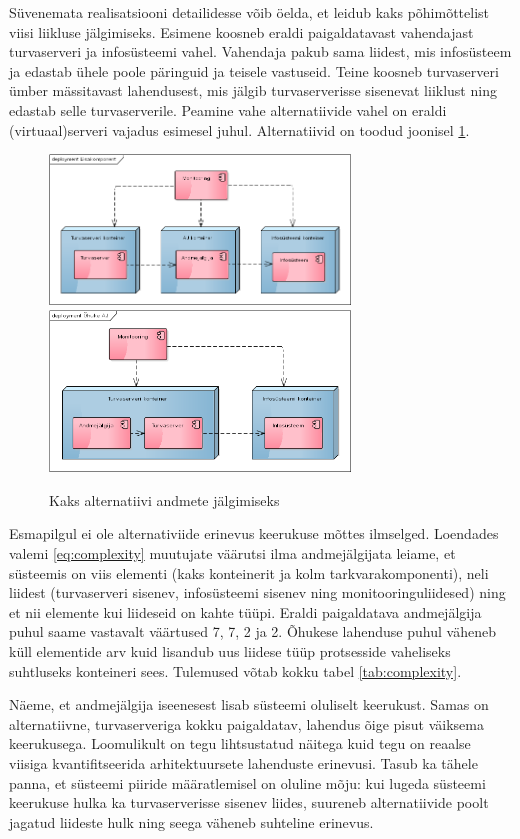 Süvenemata realisatsiooni detailidesse võib öelda, et leidub kaks põhimõttelist viisi liikluse jälgimiseks. Esimene koosneb eraldi paigaldatavast vahendajast turvaserveri ja infosüsteemi vahel. Vahendaja pakub sama liidest, mis infosüsteem ja edastab ühele poole päringuid ja teisele vastuseid. Teine koosneb turvaserveri ümber mässitavast lahendusest, mis jälgib turvaserverisse sisenevat liiklust ning edastab selle turvaserverile. Peamine vahe alternatiivide vahel on eraldi (virtuaal)serveri vajadus esimesel juhul. Alternatiivid on toodud joonisel \ref{fig:complexity:added}.


\begin{figure}[ht]
		\includegraphics[width=8cm]{lisakomponent.png}
		\includegraphics[width=8cm]{ohuke.png}
		\caption{Kaks alternatiivi andmete jälgimiseks}
		\label{fig:complexity:added}
\end{figure}

Esmapilgul ei ole alternativiide erinevus keerukuse mõttes ilmselged. Loendades valemi \ref{eq:complexity} muutujate väärutsi ilma andmejälgijata leiame, et süsteemis on viis elementi (kaks konteinerit ja kolm tarkvarakomponenti), neli liidest (turvaserveri sisenev, infosüsteemi sisenev ning monitooringuliidesed) ning et nii elemente kui liideseid on kahte tüüpi. Eraldi paigaldatava andmejälgija puhul saame vastavalt väärtused 7, 7, 2 ja 2. Õhukese lahenduse puhul väheneb küll elementide arv kuid lisandub uus liidese tüüp protsesside vaheliseks suhtluseks konteineri sees. Tulemused võtab kokku tabel \ref{tab:complexity}. 

Näeme, et andmejälgija iseenesest lisab süsteemi oluliselt keerukust. Samas on alternatiivne, turvaserveriga kokku paigaldatav, lahendus õige pisut väiksema keerukusega. Loomulikult on tegu lihtsustatud näitega kuid tegu on reaalse viisiga kvantifitseerida arhitektuursete lahenduste erinevusi. Tasub ka tähele panna, et süsteemi piiride määratlemisel on oluline mõju: kui lugeda süsteemi keerukuse hulka ka turvaserverisse sisenev liides, suureneb alternatiivide poolt jagatud liideste hulk ning seega väheneb suhteline erinevus. 


